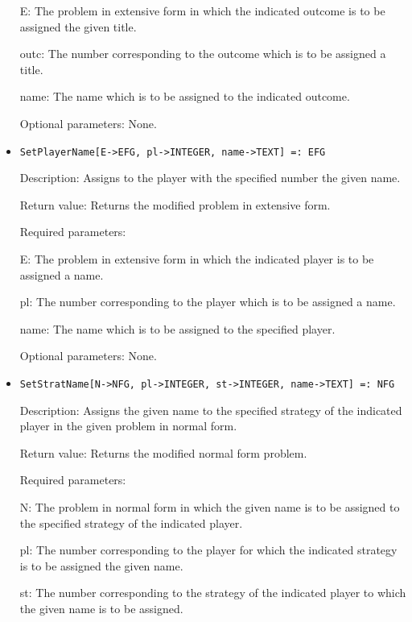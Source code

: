 \begin{itemize}
\bd
\item
[E:] The problem in extensive form in which the indicated outcome is
to be assigned the given title.
\item
[outc:] The number corresponding to the outcome which is to be
assigned a title.
\item
[name:] The name which is to be assigned to the indicated outcome.
\ed

\item
[Optional parameters:] None.
\ed

\item

\protect \large \begin{verbatim}
SetPlayerName[E->EFG, pl->INTEGER, name->TEXT] =: EFG
\end{verbatim}\normalsize

\bd
\item
[Description:] Assigns to the player with the specified number the
given name.
\item
[Return value:] Returns the modified problem in extensive form.
\item
[Required parameters:]\hfil\null

\bd
\item
[E:] The problem in extensive form in which the indicated player is to
be assigned a name.
\item
[pl:] The number corresponding to the player which is to be assigned a
name.
\item
[name:] The name which is to be assigned to the specified player.
\ed
\item
[Optional parameters:] None.
\ed

\item

\protect \large \begin{verbatim}
SetStratName[N->NFG, pl->INTEGER, st->INTEGER, name->TEXT] =: NFG
\end{verbatim}\normalsize

\bd
\item
[Description:] Assigns the given name to the specified strategy of the
indicated player in the given problem in normal form.
\item
[Return value:] Returns the modified normal form problem.
\item
[Required parameters:]\hfil\null
	
\bd
\item
[N:] The problem in normal form in which the given name is to be
assigned to the specified strategy of the indicated player.
\item
[pl:] The number corresponding to the player for which the indicated
strategy is to be assigned the given name.
\item
[st:] The number corresponding to the strategy of the indicated player
to which the given name is to be assigned.
\ed


\end{itemize}
